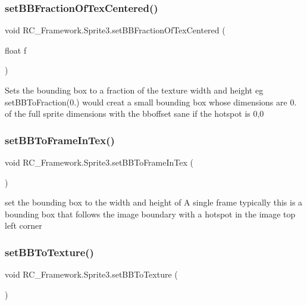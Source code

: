 \subsubsection{\texorpdfstring{set\+B\+B\+Fraction\+Of\+Tex\+Centered()}{setBBFractionOfTexCentered()}}
{\footnotesize\ttfamily void R\+C\+\_\+\+Framework.\+Sprite3.\+set\+B\+B\+Fraction\+Of\+Tex\+Centered (\begin{DoxyParamCaption}\item[{float}]{f }\end{DoxyParamCaption})}



Sets the bounding box to a fraction of the texture width and height eg set\+B\+B\+To\+Fraction(0.) would creat a small bounding box whose dimensions are 0. of the full sprite dimensions with the bboffset sane if the hotspot is 0,0 

\mbox{\label{class_r_c___framework_1_1_sprite3_a820e5316676eee1ef5fccdc9ac07cf15}} 
\subsubsection{\texorpdfstring{set\+B\+B\+To\+Frame\+In\+Tex()}{setBBToFrameInTex()}}
{\footnotesize\ttfamily void R\+C\+\_\+\+Framework.\+Sprite3.\+set\+B\+B\+To\+Frame\+In\+Tex (\begin{DoxyParamCaption}{ }\end{DoxyParamCaption})}



set the bounding box to the width and height of A single frame typically this is a bounding box that follows the image boundary with a hotspot in the image top left corner 

\mbox{\label{class_r_c___framework_1_1_sprite3_a352f91941f5ca2df898d966564e4c875}} 
\subsubsection{\texorpdfstring{set\+B\+B\+To\+Texture()}{setBBToTexture()}}
{\footnotesize\ttfamily void R\+C\+\_\+\+Framework.\+Sprite3.\+set\+B\+B\+To\+Texture (\begin{DoxyParamCaption}{ }\end{DoxyParamCaption})}



